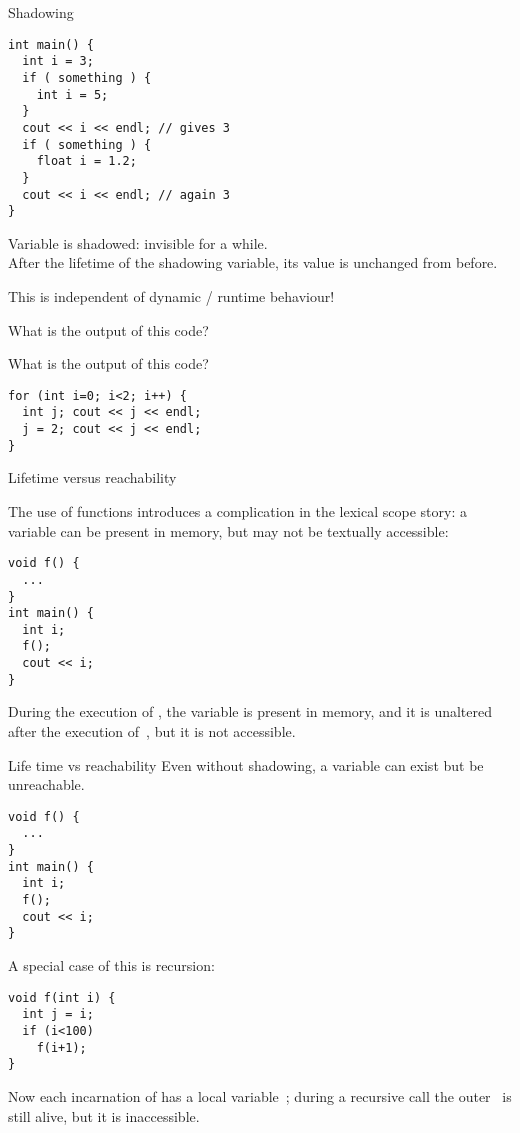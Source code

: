\begin{slide}{Shadowing}
  \label{sl:scope-shadow}
\begin{verbatim}
int main() {
  int i = 3;
  if ( something ) {
    int i = 5;
  }
  cout << i << endl; // gives 3
  if ( something ) {
    float i = 1.2;
  }
  cout << i << endl; // again 3
}
\end{verbatim}
Variable  is shadowed: invisible for a while.\\
After the lifetime of the shadowing variable, its value is unchanged
from before.
\end{slide}

This is independent of dynamic / runtime behaviour!

\begin{exercise}
  \label{ex:shadowfalse}
  What is the output of this code?
\end{exercise}

\begin{exercise}
  \label{ex:loopinitvar}
  What is the output of this code?
\begin{verbatim}
for (int i=0; i<2; i++) {
  int j; cout << j << endl;
  j = 2; cout << j << endl;
}
\end{verbatim}
\end{exercise}

 {Lifetime versus reachability}

The use of functions introduces a complication in the lexical scope story:
a variable can be present in memory, but may not be textually accessible:
\begin{verbatim}
void f() {
  ...
}
int main() {
  int i;
  f();
  cout << i;
}
\end{verbatim}
During the execution of , the variable  is present in
memory, and it is unaltered after the execution of~,
but it is not accessible.

\begin{slide}{Life time vs reachability}
  \label{sl:scope-lifetime}
  Even without shadowing, a variable can exist but be unreachable.
\begin{verbatim}
void f() {
  ...
}
int main() {
  int i;
  f();
  cout << i;
}
\end{verbatim}
\end{slide}

A special case of this is recursion:
\begin{verbatim}
void f(int i) {
  int j = i;
  if (i<100)
    f(i+1);
}
\end{verbatim}
Now each incarnation of  has a local variable~; during a
recursive call the outer~ is still alive, but it is inaccessible.

